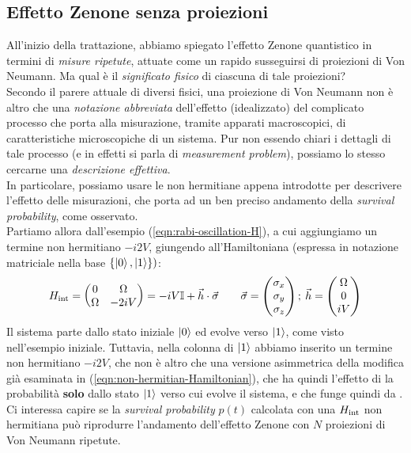 \documentclass[../../InformazioneQuantistica.tex]{subfiles}
\begin{document}
\subsection{Effetto Zenone senza proiezioni}
All'inizio della trattazione, abbiamo spiegato l'effetto Zenone quantistico in termini di \textit{misure ripetute}, attuate come un rapido susseguirsi di proiezioni di Von Neumann. Ma qual è il \textit{significato fisico} di ciascuna di tale proiezioni?\\
Secondo il parere attuale di diversi fisici, una proiezione di Von Neumann non è altro che una \textit{notazione abbreviata} dell'effetto (idealizzato) del complicato processo che porta alla misurazione, tramite apparati macroscopici, di caratteristiche microscopiche di un sistema. Pur non essendo chiari i dettagli di tale processo (e in effetti si parla di \textit{measurement problem}), possiamo lo stesso cercarne una \textit{descrizione effettiva}.\\
In particolare, possiamo usare le  non hermitiane appena introdotte per descrivere l'effetto delle misurazioni, che porta ad un ben preciso andamento della \textit{survival probability}, come osservato.\\

Partiamo allora dall'esempio (\ref{eqn:rabi-oscillation-H}), a cui aggiungiamo un termine non hermitiano $-i2V$, giungendo all'Hamiltoniana (espressa in notazione matriciale nella base $\{\Ket{0}, \Ket{1}\})$:
\begin{align}
H_{\operatorname{int}} = \begin{pmatrix} 0 & \Omega \\ \Omega & - 2iV\end{pmatrix} = -iV \mathbb{I} + \vec{h}\cdot \vec{\sigma} \qquad \vec{\sigma} = \begin{pmatrix} \sigma_x\\\sigma_y \\ \sigma_z\end{pmatrix}; \> \vec{h} = \begin{pmatrix} \Omega \\ 0 \\ iV \end{pmatrix}
\label{eqn:H-non-hermitiana-esempio}
\end{align}
Il sistema parte dallo stato iniziale $\Ket{0}$ ed evolve verso $\Ket{1}$, come visto nell'esempio iniziale. Tuttavia, nella colonna di $\Ket{1}$ abbiamo inserito un termine non hermitiano $-i2V$, che non è altro che una versione asimmetrica della modifica già esaminata in (\ref{eqn:non-hermitian-Hamiltonian}), che ha quindi l'effetto di  la probabilità \textbf{solo} dallo stato $\Ket{1}$ verso cui evolve il sistema, e che funge quindi da . Ci interessa capire se la \textit{survival probability} $p(t)$ calcolata con una $H_{\operatorname{int}}$ non hermitiana può riprodurre l'andamento  dell'effetto Zenone con $N$ proiezioni di Von Neumann ripetute.\\
\end{document}
